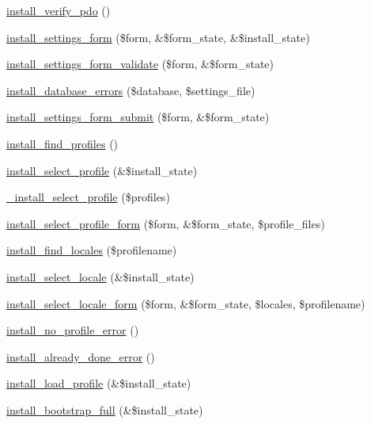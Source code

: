 \begin{DoxyCompactItemize}
\item 
\hyperlink{install_8core_8inc_a05cc52656e3a172f087a5043eb00087a}{install\_\-verify\_\-pdo} ()
\item 
\hyperlink{group__forms_ga4fe8554aa15e5b0b78a15400c2d37d28}{install\_\-settings\_\-form} (\$form, \&\$form\_\-state, \&\$install\_\-state)
\item 
\hyperlink{install_8core_8inc_a81a30e13b22aa1ad8b0fa4b8f2f07c82}{install\_\-settings\_\-form\_\-validate} (\$form, \&\$form\_\-state)
\item 
\hyperlink{install_8core_8inc_a695213046db5d896caef10f82da54b87}{install\_\-database\_\-errors} (\$database, \$settings\_\-file)
\item 
\hyperlink{install_8core_8inc_abe061599cf0c6252388fc93366ebae27}{install\_\-settings\_\-form\_\-submit} (\$form, \&\$form\_\-state)
\item 
\hyperlink{install_8core_8inc_a0b98c0d4c34d20f6334cc0f609c65ac8}{install\_\-find\_\-profiles} ()
\item 
\hyperlink{install_8core_8inc_a4fdd2e2671bc0dd16717b898a7e25cbc}{install\_\-select\_\-profile} (\&\$install\_\-state)
\item 
\hyperlink{install_8core_8inc_a50f553802d50cc291614aa584c6960b1}{\_\-install\_\-select\_\-profile} (\$profiles)
\item 
\hyperlink{group__forms_ga1ead61881194a861349f2c1c1e508752}{install\_\-select\_\-profile\_\-form} (\$form, \&\$form\_\-state, \$profile\_\-files)
\item 
\hyperlink{install_8core_8inc_a2a4848ecf0e42d2782a9b58857e6476b}{install\_\-find\_\-locales} (\$profilename)
\item 
\hyperlink{install_8core_8inc_accf7b9346a3fc1ac88bb8787addc41f5}{install\_\-select\_\-locale} (\&\$install\_\-state)
\item 
\hyperlink{group__forms_ga7c540506932fb00783972b742787ddeb}{install\_\-select\_\-locale\_\-form} (\$form, \&\$form\_\-state, \$locales, \$profilename)
\item 
\hyperlink{install_8core_8inc_a78dd97fe8667cff59641b2adc55436cf}{install\_\-no\_\-profile\_\-error} ()
\item 
\hyperlink{install_8core_8inc_a6469cc717a3ac52eece0537630addea4}{install\_\-already\_\-done\_\-error} ()
\item 
\hyperlink{install_8core_8inc_a8ef7587c3c0812d35629396360b3797e}{install\_\-load\_\-profile} (\&\$install\_\-state)
\item 
\hyperlink{install_8core_8inc_ad5fe84024130a1d93d0238d0c3d2cfb5}{install\_\-bootstrap\_\-full} (\&\$install\_\-state)

\end{DoxyCompactItemize}
